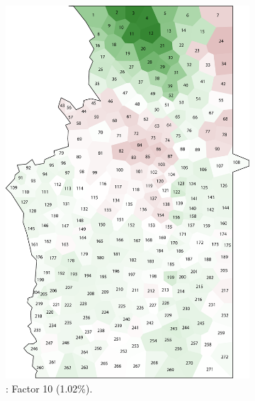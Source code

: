 \documentclass[output=paper]{LSP/langsci}
\begin{document}
\begin{figure}
\begin{subfigure}[t]{0.3\textwidth}
\includegraphics[width=\textwidth]{illustrations/pickl_fig9}
\caption{: Factor 10 (1.02\%).}
\label{fig:pickl:9}
\end{subfigure}   
~
\begin{subfigure}[t]{0.3\textwidth}

\end{subfigure}
\end{figure}
\end{document}
